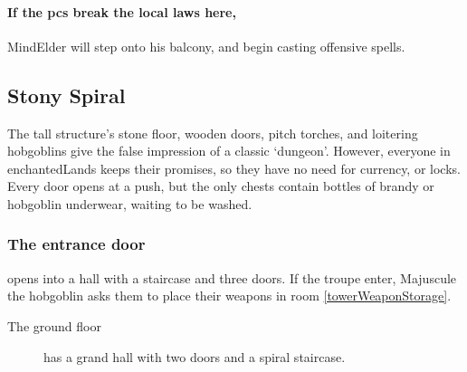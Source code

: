\begin{multicols}{2}

\paragraph{If the \glspl{pc} break the local laws here,}
\gls{MindElder} will step onto his balcony, and begin casting offensive spells.

\subsection{Stony Spiral}

The tall structure's stone floor, wooden doors, pitch torches, and loitering hobgoblins give the false impression of a classic `dungeon'.
However, everyone in \gls{enchantedLands} keeps their promises, so they have no need for currency, or locks.
Every door opens at a push, but the only chests contain bottles of brandy or hobgoblin underwear, waiting to be washed.

\subsubsection{The entrance door}
opens into a hall with a staircase and three doors.
If the troupe enter, Majuscule the hobgoblin asks them to place their weapons in room \vref{towerWeaponStorage}.

\begin{description}
  \item[The ground floor]
  has a grand hall with two doors and a spiral staircase.


\end{description}
\end{multicols}
